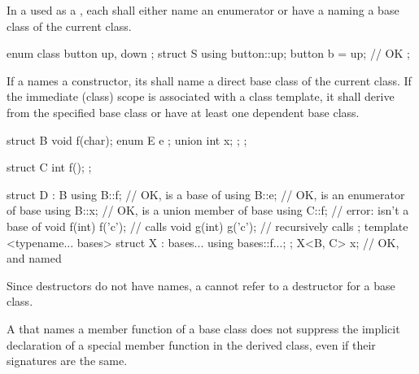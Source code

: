 \pnum
In a  used as a
,
each 
shall either name an enumerator
or have a 
naming a base class of the current class.
\begin{example}
\begin{codeblock}
enum class button { up, down };
struct S {
  using button::up;
  button b = up;                // OK
};
\end{codeblock}
\end{example}
If a
 names a constructor,
its  shall name
a direct base class of the current class.
If the immediate (class) scope is associated with a class template,
it shall derive from the specified base class or
have at least one dependent base class.
\begin{example}
\begin{codeblock}
struct B {
  void f(char);
  enum E { e };
  union { int x; };
};

struct C {
  int f();
};

struct D : B {
  using B::f;                   // OK,  is a base of 
  using B::e;                   // OK,  is an enumerator of base 
  using B::x;                   // OK,  is a union member of base 
  using C::f;                   // error:  isn't a base of 
  void f(int) { f('c'); }       // calls 
  void g(int) { g('c'); }       // recursively calls 
};
template <typename... bases>
struct X : bases... {
  using bases::f...;
};
X<B, C> x;                      // OK,  and  named
\end{codeblock}
\end{example}

\pnum
\begin{note}
Since destructors do not have names, a
 cannot refer to a
destructor for a base class.
\end{note}
\begin{note}
A  that
names a member function of a base class
does not suppress the implicit declaration of a special member function
in the derived class,
even if their signatures are the
same.
\end{note}

